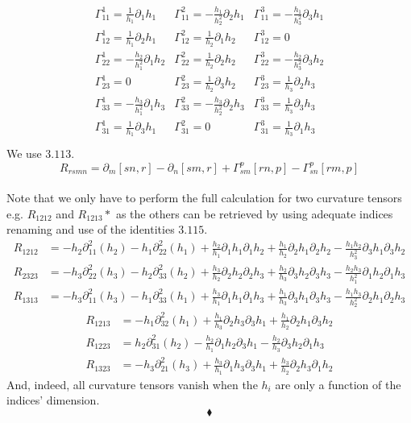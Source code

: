 \begin{align}
\begin{array}{lll}
\Gamma^1_{11}=\frac{1}{h_{1}}\partial_{1}{h_{1}} &\Gamma^2_{11}=-\frac{h_{1}}{h_{2}^2}\partial_{2}{h_{1}}  & \Gamma^3_{11}= -\frac{h_{1}}{h_{3}^2}\partial_{3}{h_{1}}   \\
\Gamma^1_{12}= \frac{1}{h_{1}}\partial_{2}{h_{1}} &\Gamma^2_{12}=\frac{1}{h_{2}}\partial_{1}{h_{2}} & \Gamma^3_{12}=0\\
\Gamma^1_{22}= -\frac{h_{2}}{h_{1}^2}\partial_{1}{h_{2}} &\Gamma^2_{22}=\frac{1}{h_{2}}\partial_{2}{h_{2}} & \Gamma^3_{22}=-\frac{h_{2}}{h_{3}^2}\partial_{3}{h_{2}} \\
\Gamma^1_{23}=0 &\Gamma^2_{23}=\frac{1}{h_{2}}\partial_{3}{h_{2}} & \Gamma^3_{23}= \frac{1}{h_{3}}\partial_{2}{h_{3}}\\
\Gamma^1_{33}= -\frac{h_{3}}{h_{1}^2}\partial_{1}{h_{3}}&\Gamma^2_{33}=-\frac{h_{3}}{h_{2}^2}\partial_{2}{h_{3}} & \Gamma^3_{33}= \frac{1}{h_{3}}\partial_{3}{h_{3}}\\
\Gamma^1_{31}=\frac{1}{h_{1}}\partial_{3}{h_{1}} &\Gamma^2_{31}=0 & \Gamma^3_{31}=\frac{1}{h_{3}}\partial_{1}{h_{3}} \\
\end{array}
\end{align}
We use $3.113.$ $$R_{rsmn}= \partial_m[sn,r] -\partial_n[sm,r]+\Gamma^p_{sm}[rn,p]-\Gamma^p_{sn}[rm,p]$$\\

Note that we only have to perform the full calculation for two curvature tensors e.g. $R_{1212}$ and $R_{1213}*$  as the others can be retrieved by using adequate indices renaming and use of the identities $3.115.$
\begin{align}
R_{1212}&=
-h_2\partial_{11}^2(h_2)-h_1\partial_{22}^2(h_1)
+\frac{h_2}{h_1}\partial_1 h_1\partial_1 h_2+\frac{h_1}{h_2}\partial_2 h_1\partial_2 h_2-\frac{h_1 h_2}{h_3^2}\partial_3 h_1\partial_3 h_2\\
R_{2323}&=
-h_3\partial_{22}^2(h_3)-h_2\partial_{33}^2(h_2)
+\frac{h_3}{h_2}\partial_2 h_2\partial_2 h_3+\frac{h_2}{h_3}\partial_3 h_2\partial_3 h_3-\frac{h_2 h_3}{h_1^2}\partial_1 h_2\partial_1 h_3\\
R_{1313}&=
-h_3\partial_{11}^2(h_3)-h_1\partial_{33}^2(h_1)
+\frac{h_3}{h_1}\partial_1 h_1\partial_1 h_3+\frac{h_1}{h_3}\partial_3 h_1\partial_3 h_3-\frac{h_1 h_3}{h_2^2}\partial_2 h_1\partial_2 h_3
\end{align}
\begin{align}
R_{1213}&=-h_1\partial_{32}^2(h_1)+\frac{h_1}{h_3}\partial_2 h_3\partial_3 h_1+\frac{h_1}{h_2}\partial_2 h_1\partial_3 h_2\\
R_{1223}&=h_2\partial_{31}^2(h_2)-\frac{h_2}{h_1}\partial_1 h_2\partial_3 h_1-\frac{h_2}{h_3}\partial_3 h_2\partial_1 h_3\\
R_{1323}&=
-h_3\partial_{21}^2(h_3)+\frac{h_3}{h_1}\partial_1 h_3\partial_3 h_1+\frac{h_3}{h_2}\partial_2 h_3\partial_1 h_2
\end{align}
And, indeed, all curvature tensors vanish when the $h_i$ are only a function of the indices' dimension.
$$\blacklozenge$$
\newpage


